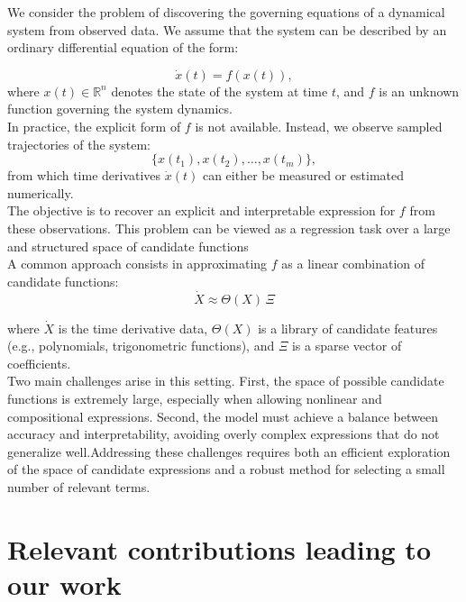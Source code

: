\documentclass[11pt, a4paper]{article}
\begin{document}
We consider the problem of discovering the governing equations of a dynamical system from observed data. We assume that the system can be described by an ordinary differential equation of the form:

\begin{equation}
\dot{x}(t) = f(x(t)),
\end{equation}
where $x(t) \in \mathbb{R}^n$ denotes the state of the system at time $t$, and $f$ is an unknown function governing the system dynamics.\\

In practice, the explicit form of $f$ is not available. Instead, we observe sampled trajectories of the system:
\begin{equation}
\{x(t_1), x(t_2), \dots, x(t_m)\},
\end{equation}
from which time derivatives $\dot{x}(t)$ can either be measured or estimated numerically.\\

The objective is to recover an explicit and interpretable expression for $f$ from these observations. This problem can be viewed as a regression task over a large and structured space of candidate functions\\

A common approach consists in approximating $f$ as a linear combination of candidate functions:
\begin{equation}
\dot{X} \approx \Theta(X) \, \Xi
\end{equation}

where $\dot{X}$ is the time derivative data, $\Theta(X)$ is a library of candidate features (e.g., polynomials, trigonometric functions), and $\Xi$ is a sparse vector of coefficients. \\

Two main challenges arise in this setting. First, the space of possible candidate functions is extremely large, especially when allowing nonlinear and compositional expressions. Second, the model must achieve a balance between accuracy and interpretability, avoiding overly complex expressions that do not generalize well.Addressing these challenges requires both an efficient exploration of the space of candidate expressions and a robust method for selecting a small number of relevant terms.

\section{Relevant contributions leading to our work}
\label{sec:related_work}
\end{document}
